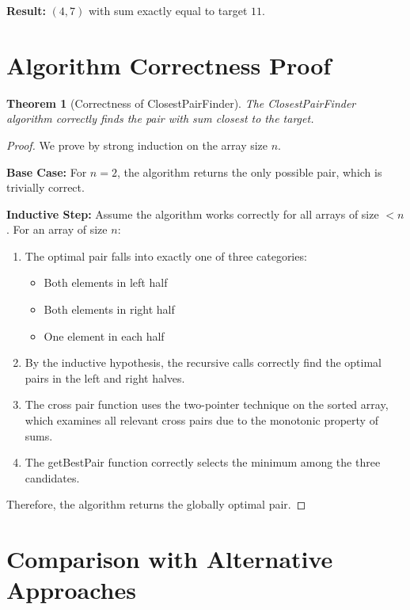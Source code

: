 \documentclass[12pt,a4paper]{article}
\newtheorem{theorem}{Theorem}
\begin{document}
\textbf{Result:} $(4,7)$ with sum exactly equal to target $11$.

\section{Algorithm Correctness Proof}

\begin{theorem}[Correctness of ClosestPairFinder]
The ClosestPairFinder algorithm correctly finds the pair with sum closest to the target.
\end{theorem}

\begin{proof}
We prove by strong induction on the array size $n$.

\textbf{Base Case:} For $n = 2$, the algorithm returns the only possible pair, which is trivially correct.

\textbf{Inductive Step:} Assume the algorithm works correctly for all arrays of size $< n$. For an array of size $n$:

\begin{enumerate}
    \item The optimal pair falls into exactly one of three categories:
    \begin{itemize}
        \item Both elements in left half
        \item Both elements in right half  
        \item One element in each half
    \end{itemize}
    
    \item By the inductive hypothesis, the recursive calls correctly find the optimal pairs in the left and right halves.
    
    \item The cross pair function uses the two-pointer technique on the sorted array, which examines all relevant cross pairs due to the monotonic property of sums.
    
    \item The getBestPair function correctly selects the minimum among the three candidates.
\end{enumerate}

Therefore, the algorithm returns the globally optimal pair.
\end{proof}

\section{Comparison with Alternative Approaches}
\end{document}
